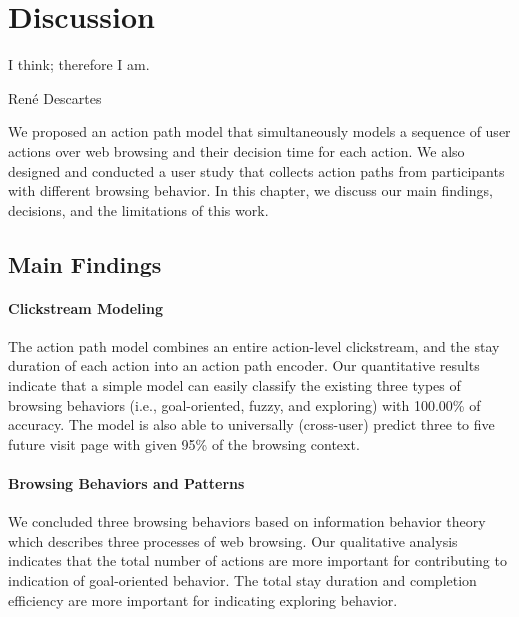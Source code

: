 \section{Discussion}
\label{ch:discuss}

\epigraph{I think; therefore I am.}{Ren\'e Descartes}

We proposed an action path model that simultaneously models a sequence of user actions 
over web browsing and their decision time for each action.
We also designed and conducted a user study that collects action paths
from participants with different browsing behavior.
In this chapter, we discuss our main findings, decisions, and the limitations of this work.

\subsection{Main Findings}

\paragraph{Clickstream Modeling}

The action path model combines an entire action-level clickstream,
and the stay duration of each action into an action path encoder.
Our quantitative results indicate that 
a simple model can easily classify the existing three types of browsing
behaviors (i.e., goal-oriented, fuzzy, and exploring) with 100.00\% of accuracy.
The model is also able to universally (cross-user) predict three to five future visit 
page with given 95\% of the browsing context.

\paragraph{Browsing Behaviors and Patterns}

We concluded three browsing behaviors based on information behavior theory which describes
three processes of web browsing.
Our qualitative analysis indicates that the total number of actions are more important 
for contributing to indication of goal-oriented behavior.
The total stay duration and completion efficiency are more important for indicating 
exploring behavior.

